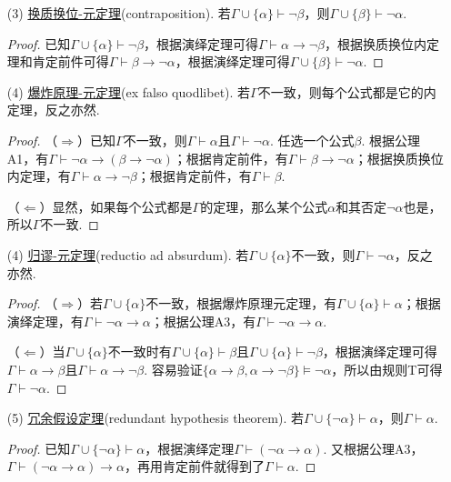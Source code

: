 \documentclass[main.tex]{subfiles}
\begin{document}
\begin{itemize}
    \item [(3)] \uline{换质换位-元定理}(contraposition). 若\(\Gamma \cup \{\alpha\} \vdash \neg \beta\)，则\(\Gamma \cup \{\beta\} \vdash \neg \alpha\).
    \begin{proof}
        已知\(\Gamma \cup \{\alpha\} \vdash \neg \beta\)，根据演绎定理可得\(\Gamma \vdash \alpha \to \neg \beta\)，根据换质换位内定理和肯定前件可得\(\Gamma \vdash \beta \to \neg \alpha\)，根据演绎定理可得\(\Gamma \cup \{\beta\} \vdash \neg \alpha\).
    \end{proof}

    \item [(4)] \uline{爆炸原理-元定理}(ex falso quodlibet). 若\(\Gamma\)不一致，则每个公式都是它的内定理，反之亦然.
    \begin{proof}
        （\(\Rightarrow\)）已知\(\Gamma\)不一致，则\(\Gamma \vdash \alpha\)且\(\Gamma \vdash \neg \alpha\). 任选一个公式\(\beta\).
        根据公理A1，有\(\Gamma \vdash \neg \alpha \to (\beta \to \neg \alpha)\)；根据肯定前件，有\(\Gamma \vdash \beta \to \neg \alpha\)；根据换质换位内定理，有\(\Gamma \vdash \alpha \to \neg \beta\)；根据肯定前件，有\(\Gamma \vdash \beta\).
        
        （\(\Leftarrow\)）显然，如果每个公式都是\(\Gamma\)的定理，那么某个公式\(\alpha\)和其否定\(\neg \alpha\)也是，所以\(\Gamma\)不一致.
    \end{proof}
    
    \item [(4)] \uline{归谬-元定理}(reductio ad absurdum). 若\(\Gamma \cup \{\alpha\}\)不一致，则\(\Gamma \vdash \neg \alpha\)，反之亦然.
    \begin{proof}
        （\(\Rightarrow\)）若\(\Gamma \cup \{\alpha\}\)不一致，根据爆炸原理元定理，有\(\Gamma \cup \{\alpha\} \vdash \alpha\)；根据演绎定理，有\(\Gamma \vdash \neg \alpha \to \alpha\)；根据公理A3，有\(\Gamma \vdash \neg \alpha \to \alpha\).

        （\(\Leftarrow\)）当\(\Gamma \cup \{\alpha\}\)不一致时有\(\Gamma \cup \{\alpha\} \vdash \beta\)且\(\Gamma \cup \{\alpha\} \vdash \neg \beta\)，根据演绎定理可得\(\Gamma \vdash \alpha \to \beta\)且\(\Gamma \vdash \alpha \to \neg \beta\). 容易验证\(\{\alpha \to \beta, \alpha \to \neg \beta\} \vDash \neg \alpha\)，所以由规则T可得\(\Gamma \vdash \neg \alpha\).
    \end{proof}

    \item [(5)] \uline{冗余假设定理}(redundant hypothesis theorem). 若\(\Gamma \cup \{\neg \alpha\} \vdash \alpha\)，则\(\Gamma \vdash \alpha\).
    \begin{proof}
        已知\(\Gamma \cup \{\neg \alpha\} \vdash \alpha\)，根据演绎定理\(\Gamma \vdash (\neg \alpha \to \alpha)\). 又根据公理A3，\(\Gamma \vdash (\neg \alpha \to \alpha) \to \alpha\)，再用肯定前件就得到了\(\Gamma \vdash \alpha\).
    \end{proof}

\end{itemize}
\end{document}
